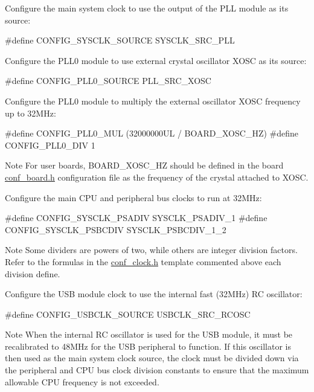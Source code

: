 \begin{DoxyEnumerate}
\item Configure the main system clock to use the output of the P\-L\-L module as its source\-: 
\begin{DoxyCode}
\textcolor{preprocessor}{ #define CONFIG\_SYSCLK\_SOURCE           SYSCLK\_SRC\_PLL }
\end{DoxyCode}

\item Configure the P\-L\-L0 module to use external crystal oscillator X\-O\-S\-C as its source\-: 
\begin{DoxyCode}
\textcolor{preprocessor}{ #define CONFIG\_PLL0\_SOURCE             PLL\_SRC\_XOSC }
\end{DoxyCode}

\item Configure the P\-L\-L0 module to multiply the external oscillator X\-O\-S\-C frequency up to 32\-M\-Hz\-: 
\begin{DoxyCode}
\textcolor{preprocessor}{        #define CONFIG\_PLL0\_MUL              (32000000UL / BOARD\_XOSC\_HZ)}
\textcolor{preprocessor}{        #define CONFIG\_PLL0\_DIV              1}
\end{DoxyCode}
 \begin{DoxyNote}{Note}
For user boards, {\ttfamily B\-O\-A\-R\-D\-\_\-\-X\-O\-S\-C\-\_\-\-H\-Z} should be defined in the board {\ttfamily \hyperlink{conf__board_8h}{conf\-\_\-board.\-h}} configuration file as the frequency of the crystal attached to X\-O\-S\-C.
\end{DoxyNote}

\item Configure the main C\-P\-U and peripheral bus clocks to run at 32\-M\-Hz\-: 
\begin{DoxyCode}
\textcolor{preprocessor}{        #define CONFIG\_SYSCLK\_PSADIV        SYSCLK\_PSADIV\_1}
\textcolor{preprocessor}{        #define CONFIG\_SYSCLK\_PSBCDIV       SYSCLK\_PSBCDIV\_1\_2}
\end{DoxyCode}
 \begin{DoxyNote}{Note}
Some dividers are powers of two, while others are integer division factors. Refer to the formulas in the \hyperlink{conf__clock_8h}{conf\-\_\-clock.\-h} template commented above each division define.
\end{DoxyNote}

\item Configure the U\-S\-B module clock to use the internal fast (32\-M\-Hz) R\-C oscillator\-: 
\begin{DoxyCode}
\textcolor{preprocessor}{        #define CONFIG\_USBCLK\_SOURCE        USBCLK\_SRC\_RCOSC}
\end{DoxyCode}
 \begin{DoxyNote}{Note}
When the internal R\-C oscillator is used for the U\-S\-B module, it must be recalibrated to 48\-M\-Hz for the U\-S\-B peripheral to function. If this oscillator is then used as the main system clock source, the clock must be divided down via the peripheral and C\-P\-U bus clock division constants to ensure that the maximum allowable C\-P\-U frequency is not exceeded.
\end{DoxyNote}


\end{DoxyEnumerate}

